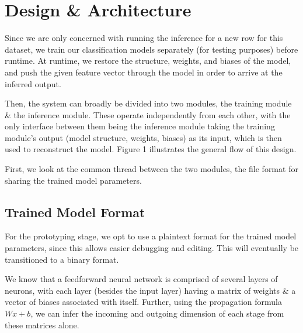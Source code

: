 \documentclass[12pt]{article}
\begin{document}
\section{Design \& Architecture}
Since we are only concerned with running the inference for a new row for this dataset, we train our classification models separately (for testing purposes) before runtime. At runtime, we restore the structure, weights, and biases of the model, and push the given feature vector through the model in order to arrive at the inferred output.\bigskip

Then, the system can broadly be divided into two modules, the training module \& the inference module. These operate independently from each other, with the only interface between them being the inference module taking the training module's output (model structure, weights, biases) as its input, which is then used to reconstruct the model. Figure 1 illustrates the general flow of this design.\bigskip

First, we look at the common thread between the two modules, the file format for sharing the trained model parameters.

\subsection{Trained Model Format}
For the prototyping stage, we opt to use a plaintext format for the trained model parameters, since this allows easier debugging and editing. This will eventually be transitioned to a binary format.\bigskip

We know that a feedforward neural network is comprised of several layers of neurons, with each layer (besides the input layer) having a matrix of weights \& a vector of biases associated with itself. Further, using the propagation formula $Wx + b$, we can infer the incoming and outgoing dimension of each stage from these matrices alone.\bigskip
\end{document}
